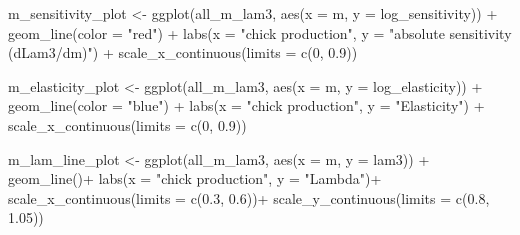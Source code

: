 \documentclass[
  letterpaper,
  DIV=11,
  numbers=noendperiod]{scrartcl}
\newenvironment{Shaded}{\begin{snugshade}}{\end{snugshade}}
\newcommand{\AttributeTok}[1]{\textcolor[rgb]{0.40,0.45,0.13}{#1}}
\newcommand{\DecValTok}[1]{\textcolor[rgb]{0.68,0.00,0.00}{#1}}
\newcommand{\FloatTok}[1]{\textcolor[rgb]{0.68,0.00,0.00}{#1}}
\newcommand{\FunctionTok}[1]{\textcolor[rgb]{0.28,0.35,0.67}{#1}}
\newcommand{\NormalTok}[1]{\textcolor[rgb]{0.00,0.23,0.31}{#1}}
\newcommand{\OtherTok}[1]{\textcolor[rgb]{0.00,0.23,0.31}{#1}}
\newcommand{\SpecialCharTok}[1]{\textcolor[rgb]{0.37,0.37,0.37}{#1}}
\newcommand{\StringTok}[1]{\textcolor[rgb]{0.13,0.47,0.30}{#1}}
\begin{document}
\begin{Shaded}
\begin{Highlighting}[]
\NormalTok{m\_sensitivity\_plot }\OtherTok{\textless{}{-}} \FunctionTok{ggplot}\NormalTok{(all\_m\_lam3, }\FunctionTok{aes}\NormalTok{(}\AttributeTok{x =}\NormalTok{ m, }\AttributeTok{y =}\NormalTok{ log\_sensitivity)) }\SpecialCharTok{+}
  \FunctionTok{geom\_line}\NormalTok{(}\AttributeTok{color =} \StringTok{"red"}\NormalTok{) }\SpecialCharTok{+}
  \FunctionTok{labs}\NormalTok{(}\AttributeTok{x =} \StringTok{"chick production"}\NormalTok{,}
       \AttributeTok{y =} \StringTok{"absolute sensitivity (dLam3/dm)"}\NormalTok{) }\SpecialCharTok{+}
  \FunctionTok{scale\_x\_continuous}\NormalTok{(}\AttributeTok{limits =} \FunctionTok{c}\NormalTok{(}\DecValTok{0}\NormalTok{, }\FloatTok{0.9}\NormalTok{))}

\NormalTok{m\_elasticity\_plot }\OtherTok{\textless{}{-}} \FunctionTok{ggplot}\NormalTok{(all\_m\_lam3, }\FunctionTok{aes}\NormalTok{(}\AttributeTok{x =}\NormalTok{ m, }\AttributeTok{y =}\NormalTok{ log\_elasticity)) }\SpecialCharTok{+}
  \FunctionTok{geom\_line}\NormalTok{(}\AttributeTok{color =} \StringTok{"blue"}\NormalTok{) }\SpecialCharTok{+}
  \FunctionTok{labs}\NormalTok{(}\AttributeTok{x =} \StringTok{"chick production"}\NormalTok{,}
       \AttributeTok{y =} \StringTok{"Elasticity"}\NormalTok{) }\SpecialCharTok{+}
  \FunctionTok{scale\_x\_continuous}\NormalTok{(}\AttributeTok{limits =} \FunctionTok{c}\NormalTok{(}\DecValTok{0}\NormalTok{, }\FloatTok{0.9}\NormalTok{))}

\NormalTok{m\_lam\_line\_plot }\OtherTok{\textless{}{-}} \FunctionTok{ggplot}\NormalTok{(all\_m\_lam3, }\FunctionTok{aes}\NormalTok{(}\AttributeTok{x =}\NormalTok{ m, }\AttributeTok{y =}\NormalTok{ lam3)) }\SpecialCharTok{+} 
  \FunctionTok{geom\_line}\NormalTok{()}\SpecialCharTok{+}
  \FunctionTok{labs}\NormalTok{(}\AttributeTok{x =} \StringTok{"chick production"}\NormalTok{,}
        \AttributeTok{y =} \StringTok{"Lambda"}\NormalTok{)}\SpecialCharTok{+}
  \FunctionTok{scale\_x\_continuous}\NormalTok{(}\AttributeTok{limits =} \FunctionTok{c}\NormalTok{(}\FloatTok{0.3}\NormalTok{, }\FloatTok{0.6}\NormalTok{))}\SpecialCharTok{+}
  \FunctionTok{scale\_y\_continuous}\NormalTok{(}\AttributeTok{limits =} \FunctionTok{c}\NormalTok{(}\FloatTok{0.8}\NormalTok{, }\FloatTok{1.05}\NormalTok{))}


\end{Highlighting}
\end{Shaded}
\end{document}
